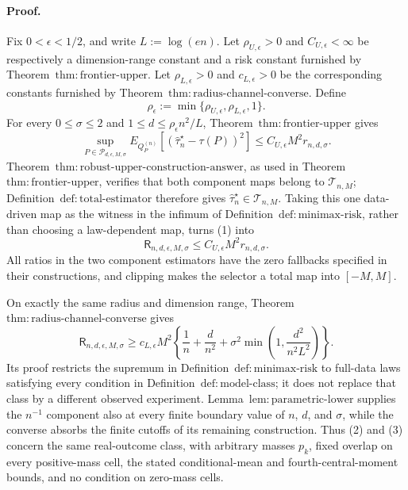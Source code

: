 \paragraph{Proof.}
Fix \(0<\epsilon<1/2\), and write \(L:=\log(en)\).  Let \(\rho_{U,\epsilon}>0\) and \(C_{U,\epsilon}<\infty\) be respectively a dimension-range constant and a risk constant furnished by Theorem~\(\mathrm{thm:frontier\text{-}upper}\).  Let \(\rho_{L,\epsilon}>0\) and \(c_{L,\epsilon}>0\) be the corresponding constants furnished by Theorem~\(\mathrm{thm:radius\text{-}channel\text{-}converse}\).  Define
\[
 \rho_{\epsilon}:=\min\{\rho_{U,\epsilon},\rho_{L,\epsilon},1\}.
\]
For every \(0\leq\sigma\leq2\) and \(1\leq d\leq \rho_{\epsilon}n^2/L\), Theorem~\(\mathrm{thm:frontier\text{-}upper}\) gives
\[
 \sup_{P\in\mathcal P_{d,\epsilon,M,\sigma}}
 E_{Q_P^{(n)}}\!\left[(\widehat\tau_n^{\star}-\tau(P))^2\right]
 \leq C_{U,\epsilon}M^2r_{n,d,\sigma}.
 \tag{1}
\]
Theorem~\(\mathrm{thm:robust\text{-}upper\text{-}construction\text{-}answer}\), as used in Theorem~\(\mathrm{thm:frontier\text{-}upper}\), verifies that both component maps belong to \(\mathcal T_{n,M}\); Definition~\(\mathrm{def:total\text{-}estimator}\) therefore gives \(\widehat\tau_n^{\star}\in\mathcal T_{n,M}\).  Taking this one data-driven map as the witness in the infimum of Definition~\(\mathrm{def:minimax\text{-}risk}\), rather than choosing a law-dependent map, turns (1) into
\[
 \mathsf R_{n,d,\epsilon,M,\sigma}
 \leq C_{U,\epsilon}M^2r_{n,d,\sigma}.
 \tag{2}
\]
All ratios in the two component estimators have the zero fallbacks specified in their constructions, and clipping makes the selector a total map into \([-M,M]\).

On exactly the same radius and dimension range, Theorem~\(\mathrm{thm:radius\text{-}channel\text{-}converse}\) gives
\[
 \mathsf R_{n,d,\epsilon,M,\sigma}
 \geq c_{L,\epsilon}M^2\left\{
 \frac1n+\frac d{n^2}
 +\sigma^2\min\left(1,\frac{d^2}{n^2L^2}\right)
 \right\}.
 \tag{3}
\]
Its proof restricts the supremum in Definition~\(\mathrm{def:minimax\text{-}risk}\) to full-data laws satisfying every condition in Definition~\(\mathrm{def:model\text{-}class}\); it does not replace that class by a different observed experiment.  Lemma~\(\mathrm{lem:parametric\text{-}lower}\) supplies the \(n^{-1}\) component also at every finite boundary value of \(n\), \(d\), and \(\sigma\), while the converse absorbs the finite cutoffs of its remaining construction.  Thus (2) and (3) concern the same real-outcome class, with arbitrary masses \(p_k\), fixed overlap on every positive-mass cell, the stated conditional-mean and fourth-central-moment bounds, and no condition on zero-mass cells.

